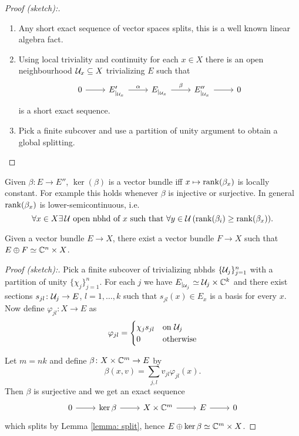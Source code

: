 \begin{proof}[Proof (sketch):]\noindent
 \begin{enumerate}
  \item Any short exact sequence of vector spaces splits, this is a well known linear algebra fact.
  \item Using local triviality and continuity for each $x\in X$ there is an open neighbourhood $\mathcal{U}_x\subseteq X$ trivializing $E$ such that $$\begin{tikzcd}0\arrow[r] & E'_{|_{\U_x}}\arrow["\alpha",r] & E_{|_{\U_x}} \arrow["\beta",r] & E''_{|_{\U_x}}\arrow[r] & 0 \end{tikzcd}$$ is a short exact sequence.
  \item Pick a finite subcover and use a partition of unity argument to obtain a global splitting.
 \end{enumerate}
\end{proof}
 \begin{remark}
  Given $\beta\colon E\to E''$, $\ker(\beta)$ is a vector bundle iff $x\mapsto\mathrm{rank}(\beta_x)$ is locally constant. For example this holds whenever $\beta$ is injective or surjective. In general $\mathrm{rank}(\beta_x)$ is lower-semicontinuous, i.e. $$\forall x\in X\exists\,\mathcal{U}\text{ open nbhd of }x\text{ such that }\forall y\in\mathcal{U}\,(\mathrm{rank}(\beta_i)\geq\mathrm{rank}(\beta_x)).$$
 \end{remark}
 
\begin{proposition}\label{prop: direct sum}
 Given a vector bundle $E\to X$, there exist a vector bundle $F\to X$ such that $E\oplus F\simeq \mathbb{C}^n\times X$.
\end{proposition}
\begin{proof}[Proof (sketch):]
 Pick a finite subcover of trivializing nbhds $\{\mathcal{U}_j\}_{j=1}^n$ with a partition of unity $\{\chi_j\}_{j=1}^n$. For each $j$ we have $E_{|_{\mathcal{U}_j}}\simeq\mathcal{U}_j\times\mathbb{C}^k$ and there exist sections $s_{jl}\colon \mathcal{U}_j\to E$, $l=1,\ldots,k$ such that $s_{jl}(x)\in E_x$ is a basis for every $x$. Now define $\varphi_{jl}\colon X\to E$ as $$\varphi_{jl}=\begin{cases}
\chi_js_{jl} & \text{on } \mathcal{U}_j \\
0 &\text{otherwise}                                                                                                                                                                                                                                        \end{cases}$$

\noindent Let $m=nk$ and define $\beta\colon X\times\mathbb{C}^m\to E$ by $$\beta(x,v)=\sum_{j,l}v_{jl}\varphi_{jl}(x).$$
Then $\beta$ is surjective and we get an exact sequence 
$$\begin{tikzcd}0\arrow[r] & \ker\beta\arrow[r] & X\times\C^m \arrow[r] & E\arrow[r] & 0 \end{tikzcd}$$
which splits by Lemma \eqref{lemma: split}, hence $E\oplus\ker\beta\simeq\mathbb{C}^m\times X$.
\end{proof}

